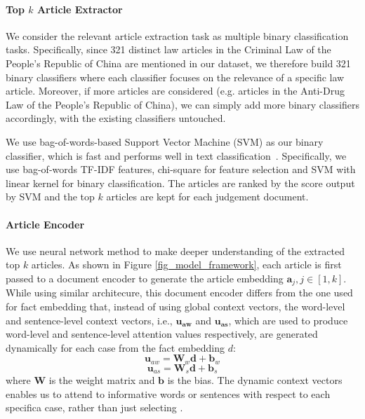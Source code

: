 \paragraph{Top $k$ Article Extractor}
\label{sec_article_extractor}
We consider the relevant article extraction task as multiple binary classification tasks. Specifically, since 321 distinct law articles in the Criminal Law of the People's Republic of China are mentioned in our dataset, we therefore build 321 binary classifiers where each classifier focuses on the relevance of a specific law article. Moreover, if more articles are considered (e.g. articles in the Anti-Drug Law of the People's Republic of China), we can simply add more binary classifiers accordingly, with the existing classifiers untouched.

We use bag-of-words-based Support Vector Machine (SVM) as our binary classifier, which is fast and performs well in text classification~\cite{joachims2002learning,wang2012baselines}. Specifically, we use bag-of-words TF-IDF features, chi-square for feature selection and SVM with linear kernel for binary classification. The articles are ranked by the score output by SVM and the top $k$ articles are kept for each judgement document.

\paragraph{Article Encoder}
\label{sec_article_encoder}
We use neural network method to make deeper understanding of the extracted top $k$ articles. 
As shown in Figure \ref{fig_model_framework}, each article is first passed to a document encoder to generate the article embedding $\mathbf{a}_j, j\in [1, k]$. 
While using similar architecure, this document encoder differs from the one used for fact embedding that, instead of using global context vectors, the word-level and sentence-level context vectors, i.e., $\mathbf{u_{aw}}$ and $\mathbf{u_{as}}$, which are used to produce word-level and sentence-level attention values respectively, are generated dynamically for each case from the fact embedding $d$:
\begin{equation}
\mathbf{u}_{aw} = \mathbf{W}_w \mathbf{d} + \mathbf{b}_w
\end{equation}
\begin{equation}
\mathbf{u}_{as} = \mathbf{W}_s \mathbf{d} + \mathbf{b}_s
\end{equation}
where $\mathbf{W}$ is the weight matrix and $\mathbf{b}$ is the bias. The dynamic context vectors enables us to attend to informative words or sentences with respect to each specifica case, rather than just selecting .

